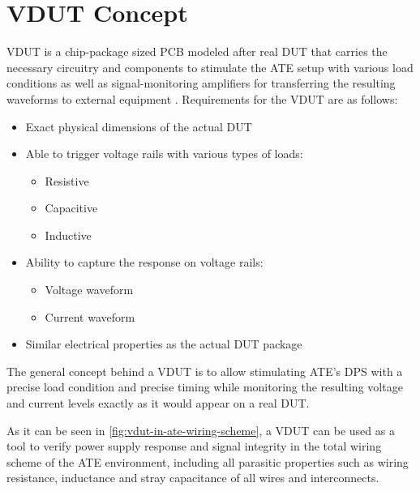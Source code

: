 

\section{\acs{VDUT} Concept}
\label{sec:vdut-concept}

\ac{VDUT} is a chip-package sized \ac{PCB} modeled after real \ac{DUT} that
carries the necessary circuitry and components to stimulate the ATE setup with
various load conditions as well as signal-monitoring amplifiers for
transferring the resulting waveforms to
external equipment \autocite{yazdani-vdut}.
Requirements for the \ac{VDUT} are as follows:

\begin{itemize}[topsep=8pt,itemsep=4pt,partopsep=4pt, parsep=4pt]
    \item Exact physical dimensions of the actual \ac{DUT}

    \item Able to trigger voltage rails with various types of loads:
    \begin{itemize}[topsep=8pt,itemsep=4pt,partopsep=4pt, parsep=4pt]
        \item Resistive
        \item Capacitive
        \item Inductive
    \end{itemize}

    \item Ability to capture the response on voltage rails:
    \begin{itemize}[topsep=8pt,itemsep=4pt,partopsep=4pt, parsep=4pt]
        \item Voltage waveform
        \item Current waveform
    \end{itemize}

    \item Similar electrical properties as the actual \ac{DUT} package

\end{itemize}

The general concept behind a \ac{VDUT} is to allow stimulating
\acs{ATE}'s \ac{DPS} with a precise load condition and
precise timing while monitoring the resulting voltage and current levels
exactly as it would appear on a real \ac{DUT}.

As it can be seen in \autoref{fig:vdut-in-ate-wiring-scheme}, a \ac{VDUT}
can be used as a tool to verify power supply response and signal integrity
in the total wiring scheme of the \ac{ATE} environment, including all
parasitic properties such as wiring resistance, inductance and stray
capacitance of all wires and interconnects.

